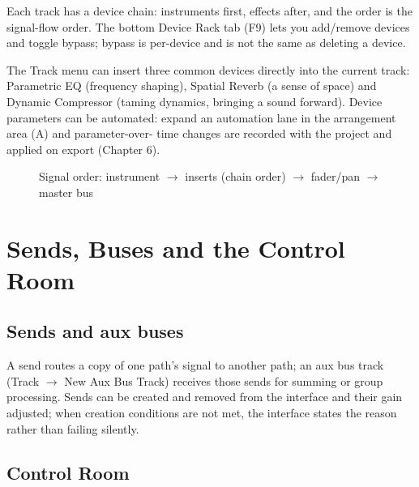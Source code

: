 Each track has a device chain: instruments first, effects after, and the order is the
signal-flow order. The bottom Device Rack tab (F9) lets you add/remove devices and
toggle bypass; bypass is per-device and is not the same as deleting a device.

The Track menu can insert three common devices directly into the current track:
Parametric EQ (frequency shaping), Spatial Reverb (a sense of space) and Dynamic
Compressor (taming dynamics, bringing a sound forward). Device parameters can be
automated: expand an automation lane in the arrangement area (A) and parameter-over-
time changes are recorded with the project and applied on export (Chapter 6).

\begin{figure}[htbp]
\centering
{}
\caption{Signal order: instrument $\to$ inserts (chain order) $\to$ fader/pan $\to$ master bus}
\label{fig:ch07-signal-flow}
\end{figure}

\section{Sends, Buses and the Control Room}

\subsection{Sends and aux buses}

A send routes a copy of one path's signal to another path; an aux bus track (Track
$\to$ New Aux Bus Track) receives those sends for summing or group processing. Sends
can be created and removed from the interface and their gain adjusted; when creation
conditions are not met, the interface states the reason rather than failing silently.


\subsection{Control Room}

